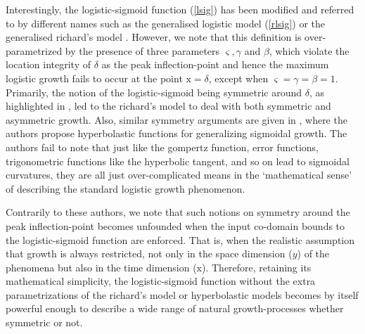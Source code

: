 \documentclass[journal]{IEEEtran}
\theoremstyle{plain}
\theoremstyle{definition}
\theoremstyle{remark}
\begin{document}
Interestingly, the logistic-sigmoid function (\ref{lsig}) has been modified and referred to by different names such as the generalised logistic model (\ref{rlsig}) or the generalised richard's model \cite{wuGeneralizedLogisticGrowth2020}. However, we note that this definition is over-parametrized by the presence of three parameters \(\varsigma, \gamma \) and \(\beta\), which violate the location integrity of \( \delta \) as the peak inflection-point and hence the maximum logistic growth fails to occur at the point $\mathrm{x}=\delta$, except when $\varsigma=\gamma=\beta=1$.  Primarily, the notion of the logistic-sigmoid being symmetric around $\delta$, as highlighted in \cite{yinFlexibleSigmoidFunction2003,loibelInferenceRichardsGrowth2006}, led to the richard's model to deal with both symmetric and asymmetric growth. Also, similar symmetry arguments are given in \cite{tabatabaiHyperbolasticGrowthModels2005}, where the authors propose hyperbolastic functions for generalizing sigmoidal growth. The authors fail to note that just like the gompertz function, error functions, trigonometric functions like the hyperbolic tangent, and so on lead to sigmoidal curvatures, they are all just over-complicated means in the `mathematical sense' of describing the standard logistic growth phenomenon.

Contrarily to these authors, we note that such notions on symmetry around the peak inflection-point becomes unfounded when the input co-domain bounds to the logistic-sigmoid function are enforced.
That is, when the realistic assumption that growth is always restricted, not only in the space dimension ($y$) of the phenomena but also in the time dimension ($\mathrm{x}$). Therefore, retaining its mathematical simplicity, the logistic-sigmoid function without the extra parametrizations of the richard's model or hyperbolastic models becomes by itself powerful enough to describe a wide range of natural growth-processes whether symmetric or not.
\end{document}
